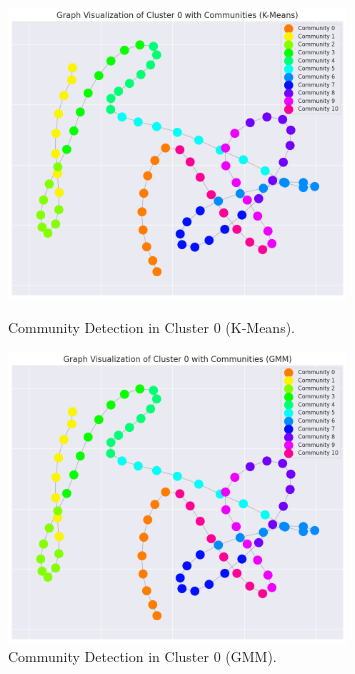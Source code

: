                 \begin{figure}[h]
                    \centering
                    \begin{minipage}[c]{0.47\textwidth}
                        \centering
                        \includegraphics[width=0.8\textwidth]{../figures/plots/section3/k-means_graph_visualization_of_cluster_0_with_communities.png}
                        \caption{Community Detection in Cluster 0 (K-Means).}
                        \label{fig:kmeans_graph}
                    \end{minipage}
                    \hfill
                    \begin{minipage}[c]{0.47\textwidth}
                        \centering
                        \includegraphics[width=0.8\textwidth]{../figures/plots/section3/gmm_graph_visualization_of_cluster_0_with_communities.png}
                        \caption{Community Detection in Cluster 0 (GMM).}
                        \label{fig:gmm_graph}
                    \end{minipage}
                \end{figure}
            

